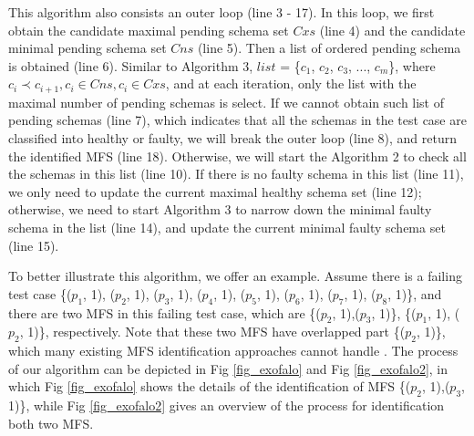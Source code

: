\documentclass{sig-alternate-05-2015}
\begin{document}
{This algorithm also consists an outer loop (line 3 - 17). In this loop, we first obtain the candidate maximal pending schema set $Cxs$ (line 4) and the candidate minimal pending schema set $Cns$ (line 5). Then a list of ordered pending schema is obtained (line 6). Similar to Algorithm 3, $list$ = \{$c_{1}$, $c_{2}$, $c_{3}$, ..., $c_{m}$\}, where $c_{i} \prec c_{i+1},  c_{i} \in Cns, c_{i} \in Cxs$, and at each iteration, only the list with the maximal number of pending schemas is select. If we cannot obtain such list of pending schemas (line 7), which indicates that all the schemas in the test case are classified into healthy or faulty, we will break the outer loop (line 8), and return the identified MFS (line 18). Otherwise, we will start the Algorithm 2 to check all the schemas in this list (line 10). If there is no faulty schema in this list (line 11), we only need to update the current maximal healthy schema set (line 12); otherwise, we need to start Algorithm 3 to narrow down the minimal faulty schema in the list (line 14), and update the current minimal faulty schema set (line 15).


To better illustrate this algorithm, we offer an example. Assume there is a failing test case \{($p_{1}$, 1), ($p_{2}$, 1), ($p_{3}$, 1), ($p_{4}$, 1), ($p_{5}$, 1), ($p_{6}$, 1), ($p_{7}$, 1), ($p_{8}$, 1)\}, and there are two MFS in this failing test case, which are \{($p_{2}$, 1),($p_{3}$, 1)\}, \{($p_{1}$, 1), ($p_{2}$, 1)\}, respectively. Note that these two MFS have overlapped part \{($p_{2}$, 1)\}, which many existing MFS identification approaches cannot handle \cite{zhang2011characterizing,nie2011minimal}. The process of our algorithm can be depicted in Fig \ref{fig_exofalo} and Fig \ref{fig_exofalo2}, in which Fig \ref{fig_exofalo} shows the details of the identification of MFS \{($p_{2}$, 1),($p_{3}$, 1)\}, while Fig \ref{fig_exofalo2} gives an overview of the process for identification both two MFS.

}
\end{document}
